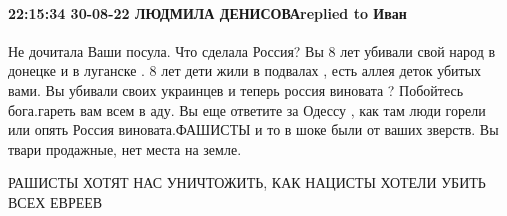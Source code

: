  
 
 
 
 

\paragraph{22:15:34 30-08-22 ЛЮДМИЛА ДЕНИСОВАreplied to Иван}

Не дочитала Ваши посула. Что сделала Россия? Вы 8 лет убивали свой народ в
донецке и в луганске . 8 лет дети жили в подвалах , есть аллея деток убитых
вами. Вы убивали своих украинцев и теперь россия виновата ? Побойтесь
бога.гареть вам всем в аду. Вы еще ответите за Одессу , как там люди горели или
опять Россия виновата.ФАШИСТЫ и то в шоке были от ваших зверств. Вы твари
продажные, нет места на земле.

РАШИСТЫ ХОТЯТ НАС УНИЧТОЖИТЬ, КАК НАЦИСТЫ ХОТЕЛИ УБИТЬ ВСЕХ ЕВРЕЕВ
